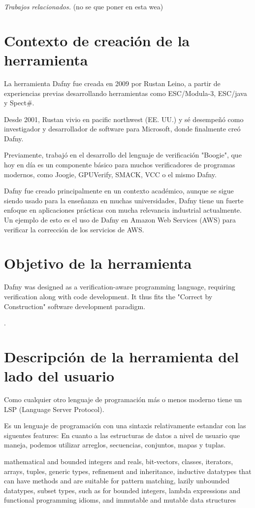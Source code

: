 \documentclass[runningheads]{llncs}
\begin{document}
\emph{Trabajos relacionados.} (no se que poner en esta wea)

\section{Contexto de creación de la herramienta}

La herramienta Dafny fue creada en 2009 por Rustan Leino,
a partir de experiencias previas desarrollando herramientas como ESC/Modula-3, ESC/java y Spect\#.

Desde 2001, Rustan vivio en pacific northwest (EE. UU.) y sé desempeñó como investigador y desarrollador de software para Microsoft,
donde finalmente creó Dafny.

Previamente, trabajó en el desarrollo del lenguaje de verificación "Boogie",
que hoy en día es un componente básico para muchos verificadores de programas modernos,
como Joogie, GPUVerify, SMACK, VCC o el mismo Dafny.    

Dafny fue creado principalmente en un contexto académico, 
aunque se sigue siendo usado para la enseñanza en muchas universidades, 
Dafny tiene un fuerte enfoque en aplicaciones prácticas con mucha relevancia industrial actualmente.
Un ejemplo de esto es el uso de Dafny en Amazon Web Services (AWS) para verificar la corrección de los servicios de AWS.

\section{Objetivo de la herramienta}
Dafny was designed as a verification-aware programming language, requiring verification along with code development. It thus fits the "Correct by Construction" software development paradigm.

.

\section{Descripción de la herramienta del lado del usuario}
Como cualquier otro lenguaje de programación más o menos moderno tiene un LSP (Language Server Protocol).

Es un lenguaje de programación con una sintaxis relativamente estandar con las siguentes features:
En cuanto a las estructuras de datos a nivel de usuario que maneja, podemos utilizar arreglos, secuencias, conjuntos, mapas y tuplas.

mathematical and bounded integers and reals, bit-vectors, classes, iterators, arrays, tuples, generic types, refinement and inheritance,
inductive datatypes that can have methods and are suitable for pattern matching,
lazily unbounded datatypes,
subset types, such as for bounded integers,
lambda expressions and functional programming idioms,
and immutable and mutable data structures
\end{document}

